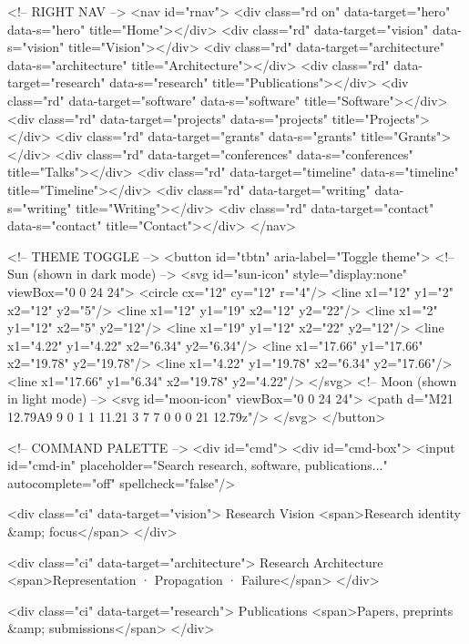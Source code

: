 <!-- RIGHT NAV -->
<nav id="rnav">
  <div class="rd on" data-target="hero"         data-s="hero"         title="Home"></div>
  <div class="rd"    data-target="vision"       data-s="vision"       title="Vision"></div>
  <div class="rd"    data-target="architecture" data-s="architecture" title="Architecture"></div>
  <div class="rd"    data-target="research"     data-s="research"     title="Publications"></div>
  <div class="rd"    data-target="software"     data-s="software"     title="Software"></div>
  <div class="rd"    data-target="projects"     data-s="projects"     title="Projects"></div>
  <div class="rd"    data-target="grants"       data-s="grants"       title="Grants"></div>
  <div class="rd"    data-target="conferences"  data-s="conferences"  title="Talks"></div>
  <div class="rd"    data-target="timeline"     data-s="timeline"     title="Timeline"></div>
  <div class="rd"    data-target="writing"      data-s="writing"      title="Writing"></div>
  <div class="rd"    data-target="contact"      data-s="contact"      title="Contact"></div>
</nav>

<!-- THEME TOGGLE -->
<button id="tbtn" aria-label="Toggle theme">
  <!-- Sun (shown in dark mode) -->
  <svg id="sun-icon" style="display:none" viewBox="0 0 24 24">
    <circle cx="12" cy="12" r="4"/>
    <line x1="12" y1="2"  x2="12" y2="5"/>
    <line x1="12" y1="19" x2="12" y2="22"/>
    <line x1="2"  y1="12" x2="5"  y2="12"/>
    <line x1="19" y1="12" x2="22" y2="12"/>
    <line x1="4.22" y1="4.22"  x2="6.34" y2="6.34"/>
    <line x1="17.66" y1="17.66" x2="19.78" y2="19.78"/>
    <line x1="4.22" y1="19.78" x2="6.34" y2="17.66"/>
    <line x1="17.66" y1="6.34" x2="19.78" y2="4.22"/>
  </svg>
  <!-- Moon (shown in light mode) -->
  <svg id="moon-icon" viewBox="0 0 24 24">
    <path d="M21 12.79A9 9 0 1 1 11.21 3 7 7 0 0 0 21 12.79z"/>
  </svg>
</button>

<!-- COMMAND PALETTE -->
<div id="cmd">
  <div id="cmd-box">
    <input id="cmd-in"
           placeholder="Search research, software, publications..."
           autocomplete="off"
           spellcheck="false"/>

    <div class="ci" data-target="vision">
      Research Vision
      <span>Research identity &amp; focus</span>
    </div>

    <div class="ci" data-target="architecture">
      Research Architecture
      <span>Representation · Propagation · Failure</span>
    </div>

    <div class="ci" data-target="research">
      Publications
      <span>Papers, preprints &amp; submissions</span>
    </div>

